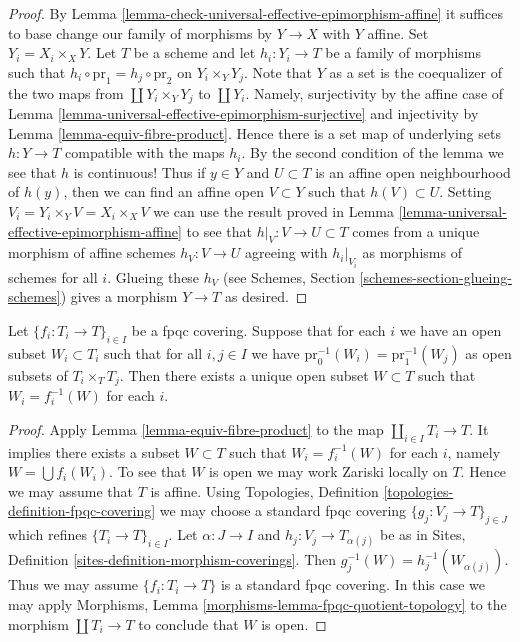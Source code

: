 \begin{proof}
By Lemma \ref{lemma-check-universal-effective-epimorphism-affine}
it suffices to base change our family of morphisms
by $Y \to X$ with $Y$ affine. Set $Y_i = X_i \times_X Y$.
Let $T$ be a scheme and let $h_i : Y_i \to T$ be a family of morphisms
such that $h_i \circ \text{pr}_1 = h_j \circ \text{pr}_2$
on $Y_i \times_Y Y_j$. Note that $Y$ as a set is the coequalizer
of the two maps from $\coprod Y_i \times_Y Y_j$ to $\coprod Y_i$.
Namely, surjectivity by the affine case of
Lemma \ref{lemma-universal-effective-epimorphism-surjective}
and injectivity by Lemma \ref{lemma-equiv-fibre-product}.
Hence there is a set map of underlying sets $h : Y \to T$
compatible with the maps $h_i$. By the second condition of
the lemma we see that $h$ is continuous!
Thus if $y \in Y$ and $U \subset T$ is an affine open
neighbourhood of $h(y)$, then we can find an affine open
$V \subset Y$ such that $h(V) \subset U$.
Setting $V_i = Y_i \times_Y V = X_i \times_X V$
we can use the result proved in
Lemma \ref{lemma-universal-effective-epimorphism-affine}
to see that $h|_V : V \to U \subset T$ comes from a unique
morphism of affine schemes $h_V : V \to U$ agreeing with $h_i|_{V_i}$
as morphisms of schemes for all $i$. Glueing these $h_V$
(see Schemes, Section \ref{schemes-section-glueing-schemes})
gives a morphism $Y \to T$ as desired.
\end{proof}

\begin{lemma}
\label{lemma-open-fpqc-covering}
Let $\{f_i : T_i \to T\}_{i \in I}$ be a fpqc covering.
Suppose that for each $i$ we have an open subset $W_i \subset T_i$
such that for all $i, j \in I$ we have
$\text{pr}_0^{-1}(W_i) = \text{pr}_1^{-1}(W_j)$ as open
subsets of $T_i \times_T T_j$. Then there exists a unique open subset
$W \subset T$ such that $W_i = f_i^{-1}(W)$ for each $i$.
\end{lemma}

\begin{proof}
Apply
Lemma \ref{lemma-equiv-fibre-product}
to the map $\coprod_{i \in I} T_i \to T$.
It implies there exists a subset $W \subset T$ such that
$W_i = f_i^{-1}(W)$ for each $i$, namely $W = \bigcup f_i(W_i)$.
To see that $W$ is open we may work Zariski locally on $T$.
Hence we may assume that $T$ is affine. Using Topologies, Definition
\ref{topologies-definition-fpqc-covering} we may choose
a standard fpqc covering $\{g_j : V_j \to T\}_{j \in J}$ which refines
$\{T_i \to T\}_{i \in I}$. Let $\alpha : J \to I$ and
$h_j : V_j \to T_{\alpha(j)}$ be as in
Sites, Definition \ref{sites-definition-morphism-coverings}.
Then $g_j^{-1}(W) = h_j^{-1}(W_{\alpha(j)})$.
Thus we may assume $\{f_i : T_i \to T\}$ is a standard fpqc covering.
In this case we may apply
Morphisms, Lemma \ref{morphisms-lemma-fpqc-quotient-topology}
to the morphism $\coprod T_i \to T$ to conclude that $W$ is open.
\end{proof}

